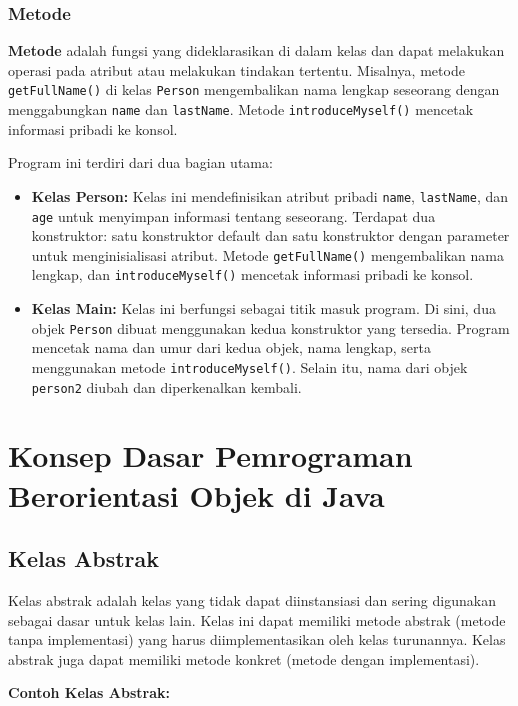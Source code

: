 \subsubsection{Metode}

\textbf{Metode} adalah fungsi yang dideklarasikan di dalam kelas dan dapat melakukan operasi pada atribut atau melakukan tindakan tertentu. Misalnya, metode \texttt{getFullName()} di kelas \texttt{Person} mengembalikan nama lengkap seseorang dengan menggabungkan \texttt{name} dan \texttt{lastName}. Metode \texttt{introduceMyself()} mencetak informasi pribadi ke konsol.

Program ini terdiri dari dua bagian utama:

\begin{itemize}
	\item \textbf{Kelas Person:} Kelas ini mendefinisikan atribut pribadi \texttt{name}, \texttt{lastName}, dan \texttt{age} untuk menyimpan informasi tentang seseorang. Terdapat dua konstruktor: satu konstruktor default dan satu konstruktor dengan parameter untuk menginisialisasi atribut. Metode \texttt{getFullName()} mengembalikan nama lengkap, dan \texttt{introduceMyself()} mencetak informasi pribadi ke konsol.
	\item \textbf{Kelas Main:} Kelas ini berfungsi sebagai titik masuk program. Di sini, dua objek \texttt{Person} dibuat menggunakan kedua konstruktor yang tersedia. Program mencetak nama dan umur dari kedua objek, nama lengkap, serta menggunakan metode \texttt{introduceMyself()}. Selain itu, nama dari objek \texttt{person2} diubah dan diperkenalkan kembali.
\end{itemize}

\section{Konsep Dasar Pemrograman Berorientasi Objek di Java}

\subsection{Kelas Abstrak}

Kelas abstrak adalah kelas yang tidak dapat diinstansiasi dan sering digunakan sebagai dasar untuk kelas lain. Kelas ini dapat memiliki metode abstrak (metode tanpa implementasi) yang harus diimplementasikan oleh kelas turunannya. Kelas abstrak juga dapat memiliki metode konkret (metode dengan implementasi).

\textbf{Contoh Kelas Abstrak:}

